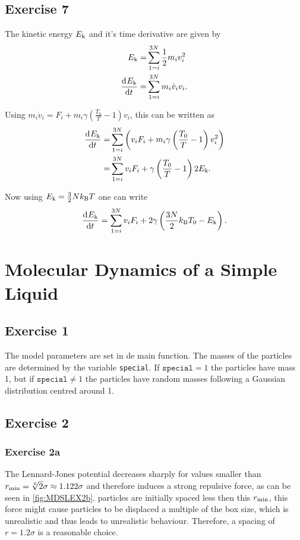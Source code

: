 \documentclass[titlepage]{report}
\begin{document}
\section{Exercise 7}
The kinetic energy $ E_{\rm{k}} $ and it's time derivative are given by
\begin{subequations}
	\begin{align}
		E_{\rm{k}} =& \sum_{1=i}^{3N}\frac{1}{2} m_i v_i^2\\
		\frac{\mathrm{d}^{} {E_{\rm{k}}}}{\mathrm{d} {t}^{}} =& \sum_{1=i}^{3N} m_i \dot{v}_i v_i.
	\end{align}
\end{subequations}

Using $	m_i \dot{v}_i = F_i + m_i \gamma \left(\frac{T_0}{T} -1 \right) v_i $, this can be written as
\begin{subequations}
	\begin{align}
		\frac{\mathrm{d}^{} {E_{\rm{k}}}}{\mathrm{d} {t}^{}} =& \sum_{1=i}^{3N} \left( v_i F_i + m_i \gamma \left(\frac{T_0}{T} -1 \right) v_i^2 \right)\\
		=& \sum_{1=i}^{3N} v_i F_i + \gamma \left(\frac{T_0}{T} -1 \right) 2 E_{\rm{k}}.
	\end{align}
\end{subequations}

Now using $ E_{\rm{k}} = \frac{3}{2}N k_{\rm{B}} T $ one can write
\begin{equation}
	\frac{\mathrm{d}^{} {E_{\rm{k}}}}{\mathrm{d} {t}^{}} = \sum_{1=i}^{3N} v_i F_i + 2\gamma \left(\frac{3 N}{2} k_{\rm{B}} T_0 - E_{\rm{k}} \right).
\end{equation}


\chapter{Molecular Dynamics of a Simple Liquid}

\section{Exercise 1}
The model parameters are set in de main function.
The masses of the particles are determined by the variable \texttt{special}.
If $ \texttt{special} = 1 $ the particles have mass 1, but if $ \texttt{special} \neq 1 $ the particles have random masses following a Gaussian distribution centred around 1.

\section{Exercise 2}
\subsection{Exercise 2a}
The Lennard-Jones potential decreases sharply for values smaller than $ r_{\rm{min}} = \sqrt[6]{2}\sigma \approx 1.122 \sigma $ and therefore induces a strong repulsive force, as can be seen in \cref{fig:MDSLEX2b}.
particles are initially spaced less then this $ r_{\rm{min}} $, this force might cause particles to be displaced a multiple of the box size, which is unrealistic and thus leads to unrealistic behaviour.
Therefore, a spacing of $ r = 1.2 \sigma $ is a reasonable choice.
\end{document}
